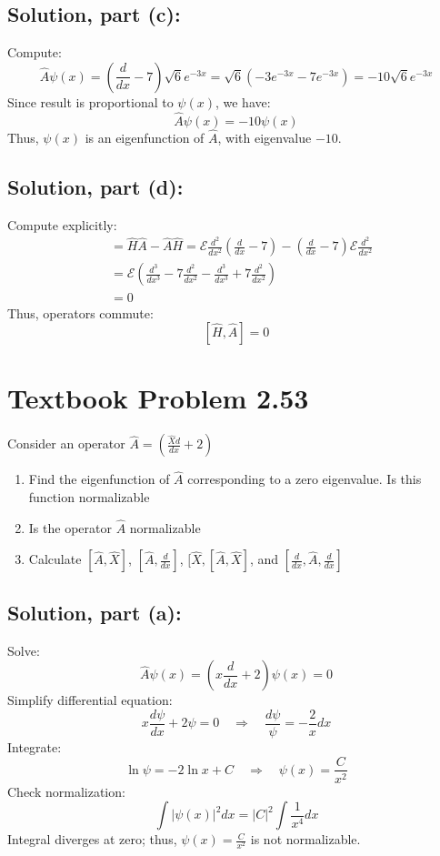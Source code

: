 \documentclass[12pt]{article}
\begin{document}
    \subsection*{Solution, part (c):}
        Compute:
        \[
        \hat{A}\psi(x)=\left(\frac{d}{dx}-7\right)\sqrt{6}e^{-3x}=\sqrt{6}(-3e^{-3x}-7e^{-3x})=-10\sqrt{6}e^{-3x}
        \]
        Since result is proportional to \(\psi(x)\), we have:
        \[
        \hat{A}\psi(x)=-10\psi(x)
        \]
        Thus, \(\psi(x)\) is an eigenfunction of \(\hat{A}\), with eigenvalue \(-10\).
        
    \subsection*{Solution, part (d):}
        Compute explicitly:
        \begin{align*}
        [\hat{H},\hat{A}]&=\hat{H}\hat{A}-\hat{A}\hat{H}=\mathcal{E}\frac{d^2}{dx^2}\left(\frac{d}{dx}-7\right)-\left(\frac{d}{dx}-7\right)\mathcal{E}\frac{d^2}{dx^2}\\[6pt]
        &=\mathcal{E}\left(\frac{d^3}{dx^3}-7\frac{d^2}{dx^2}-\frac{d^3}{dx^3}+7\frac{d^2}{dx^2}\right)\\[6pt]
        &=0
        \end{align*}
        Thus, operators commute:
        \[
        [\hat{H}, \hat{A}]=0
        \]

\section*{Textbook Problem 2.53}
    Consider an operator $\hat{A} = (\frac{\hat{X}d}{dx} + 2)$
    \begin{enumerate}
        \item [(a)] Find the eigenfunction of $\hat{A}$ corresponding to a zero eigenvalue. Is this function normalizable
        \item [(b)] Is the operator $\hat{A}$ normalizable
        \item [(c)] Calculate $[\hat{A}, \hat{X}]$, $[\hat{A}, \frac{d}{dx}]$, $[\hat{X}, [\hat{A}, \hat{X}]$, and $[\frac{d}{dx},\hat{A},\frac{d}{dx}]$
    \end{enumerate}

    \subsection*{Solution, part (a):}
        Solve:
        \[
        \hat{A}\psi(x)=\left(x\frac{d}{dx}+2\right)\psi(x)=0
        \]
        Simplify differential equation:
        \[
        x\frac{d\psi}{dx}+2\psi=0 \quad\Rightarrow\quad \frac{d\psi}{\psi}=-\frac{2}{x}dx
        \]
        Integrate:
        \[
        \ln\psi=-2\ln x+C\quad\Rightarrow\quad\psi(x)=\frac{C}{x^2}
        \]
        Check normalization:
        \[
        \int |\psi(x)|^2 dx=|C|^2\int\frac{1}{x^4}dx
        \]
        Integral diverges at zero; thus, \(\psi(x)=\frac{C}{x^2}\) is not normalizable.
\end{document}
